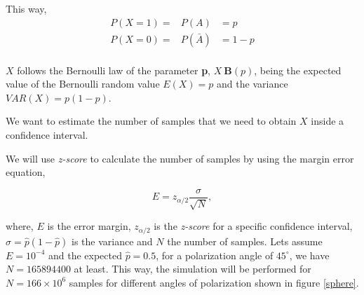 This way, 
\begin{eqnarray}
		P(X=1) =& P(A) & = p \nonumber\\
		P(X=0) =&P(\bar{A})&=1-p  \nonumber\\
\end{eqnarray}

$X$ follows the Bernoulli law of the parameter \textbf{p}, $X~\mathbf{B}(p)$, being the expected value of the Bernoulli random value $E(X)=p$ and the variance $VAR(X)=p(1-p)$.

We want to estimate the number of samples that we need to obtain $X$ inside a confidence interval.

We will use \textit{z-score} to calculate the number of samples by using the margin error equation,

\begin{equation}\label{eq:marginerror}
  E = z_{\alpha/2}\frac{\sigma}{\sqrt{N}},
  \nonumber
\end{equation}

where, $E$ is the error margin, $z_{\alpha/2}$ is the \textit{z-score} for a specific confidence interval, $\sigma = \hat{p}(1-\hat{p})$ is the variance and $N$ the number of samples. Lets assume $E=10^{-4}$ and the expected $\hat{p} = 0.5$, for a polarization angle of $45^{\circ}$, we have $N=165894400$ at least. This way, the simulation will be performed for $N=166 \times 10^{6}$ samples for different angles of polarization shown in figure \ref{sphere}.

